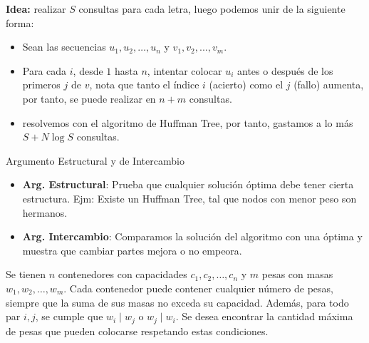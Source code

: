 \documentclass[12pt]{beamer}
\begin{document}
\begin{frame}
\begin{bloque}

\textbf{Idea:} realizar $S$ consultas para cada letra, luego podemos unir de la siguiente forma:

\begin{itemize}
    \item Sean las secuencias $u_1, u_2, \dots, u_n$ y $v_1, v_2, ..., v_m$.
    \item Para cada $i$, desde $1$ hasta $n$, intentar colocar $u_i$ antes o después de los primeros $j$ de $v$, nota
    que tanto el índice $i$ (acierto) como el $j$ (fallo) aumenta, por tanto, se puede realizar en $n + m$ consultas.
    \item resolvemos con el algoritmo de Huffman Tree, por tanto, gastamos a lo más $S + N\log S$ consultas.
\end{itemize}

\end{bloque}
\end{frame}

\begin{frame}{Argumento Estructural y de Intercambio}
\begin{definicion}
\begin{itemize}
    \item {\bfseries Arg. Estructural}: Prueba que cualquier solución óptima debe tener cierta estructura. Ejm: Existe un Huffman Tree, tal que nodos con menor peso son hermanos.
    \item {\bfseries Arg. Intercambio}: Comparamos la solución del algoritmo con una óptima y muestra que cambiar partes mejora o no empeora.
\end{itemize}
\end{definicion}
\end{frame}

\begin{frame}
\begin{bloque}[\textcolor{black}{POI 2007 Weights} (\href{https://szkopul.edu.pl/problemset/problem/h_QPStxSmfEHuL2h_I5Qpa29/site/?key=statement}{szkopul})]

Se tienen $n$ contenedores con capacidades $c_1, c_2, \dots, c_n$ y $m$ pesas con masas $w_1, w_2, \dots, w_m$. Cada contenedor puede contener cualquier número de pesas, siempre que la suma de sus masas no exceda su capacidad. Además, para todo par $i, j$, se cumple que $w_i \mid w_j$ o $w_j \mid w_i$. Se desea encontrar la cantidad máxima de pesas que pueden colocarse respetando estas condiciones.

\end{bloque}
\end{frame}
\end{document}

